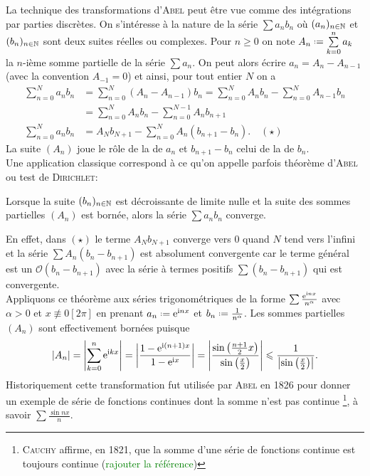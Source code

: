 La technique des transformations d'\textsc{Abel} peut être vue comme des intégrations par parties discrètes. On s'intéresse à la nature de la série $\sum a_n b_n$ où $(a_n)_{n \in \mathbb{N}}$ et $(b_n)_{n \in \mathbb{N}}$ sont deux suites réelles ou complexes. Pour $n \geqslant 0$ on note $A_n \defeq \sum\limits_{k=0}^n a_k$ la $n$-ième somme partielle de la série $\sum a_n$. On peut alors écrire $a_n = A_n - A_{n-1}$ (avec la convention $A_{-1} = 0$) et ainsi, pour tout entier $N$ on a
\begin{align*}
    \sum_{n=0}^N a_n b_n &= \sum_{n=0}^N (A_n - A_{n-1})b_n =  \sum_{n=0}^N A_n b_n -  \sum_{n=0}^N A_{n-1}b_n \\
    &= \sum_{n=0}^N A_n b_n - \sum_{n=0}^{N-1} A_n b_{n+1} \\
    \sum_{n=0}^N a_n b_n &= A_N b_{N+1} - \sum_{n=0}^N A_n(b_{n+1}-b_n). \quad (\star)
\end{align*}
La suite $(A_n)$ joue le rôle de la  de $a_n$ et $b_{n+1} - b_n$ celui de la  de $b_n$. \\
Une application classique correspond à ce qu'on appelle parfois théorème d'\textsc{Abel} ou test de \textsc{Dirichlet}: 
\begin{theo}
    Lorsque la suite $(b_n)_{n \in \mathbb{N}}$ est décroissante de limite nulle et la suite des sommes partielles $(A_n)$ est bornée, alors la série $\sum a_n b_n$ converge. 
\end{theo}

En effet, dans $(\star)$ le terme $A_N b_{N+1}$ converge vers $0$ quand $N$ tend vers l'infini et la série $\sum A_n(b_n - b_{n+1})$ est absolument convergente car le terme général est un $\mathcal{O}(b_n - b_{n+1})$ avec la série à termes positifs $\sum(b_n - b_{n+1})$ qui est convergente. \\
Appliquons ce théorème aux séries trigonométriques de la forme $\sum \frac{\mathrm{e}^{\mathrm{i} n x}}{n^\alpha}$ avec $\alpha > 0$ et $x \not \equiv 0 [2\pi]$ en prenant $a_n \defeq \me^{\mi n x}$ et $b_n \defeq \frac{1}{n^\alpha}$. Les sommes partielles $(A_n)$ sont effectivement bornées puisque
$$|A_n| = \left| \sum_{k=0}^n \mathrm{e}^{\mathrm{i} k x}\right| = \left| \frac{1 - \mathrm{e}^{\mathrm{i} (n+1)x}}{1-\mathrm{e}^{\mathrm{i} x}} \right| = \left| \frac{\sin \left( \frac{n+1}{2} x\right)}{\sin \left( \frac{x}{2} \right)} \right| \leqslant \frac{1}{\left| \sin \left( \frac{x}{2} \right) \right|}.$$
Historiquement cette transformation fut utilisée par \textsc{Abel} en 1826 pour donner un exemple de série de fonctions continues dont la somme n'est pas continue \footnote{\textsc{Cauchy} affirme, en 1821, que la somme d'une série de fonctions continue est toujours continue (\textcolor{green}{rajouter la référence})}, à savoir $\sum \frac{\sin nx}{n}$.
